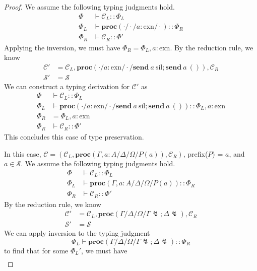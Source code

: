 \documentclass[12pt, openany]{memoir}
\newcommand*{\send}[2]{\textbf{send}\ #1\ #2}
\newcommand*{\cancel}[1]{#1 \lightning}
\newcommand*{\procObj}[4]{\textbf{proc}(#1/#2/#3/#4)}
\newcommand*{\config}[0]{\mathcal{C}}
\newcommand*{\cancelSet}[0]{\mathcal{S}}
\begin{document}
\begin{proof}
  We assume the following typing judgments hold.
  \begin{align*}
    \Phi & \vdash \config_L :: \Phi_L \\
    \Phi_L & \vdash \procObj{\cdot}{\cdot}{a : \text{exn}}{\cdot} :: \Phi_R \\
    \Phi_R & \vdash \config_R :: \Phi'
  \end{align*}
  Applying the inversion, we must have $\Phi_R = \Phi_L, a : \text{exn}$. By the reduction rule, we know
  \begin{align*}
    \config' &= \config_L, \procObj{\cdot}{a : \text{exn}}{\cdot}{\send{a}{\text{sil}}; \send{a}{()}}, \config_R \\
    \cancelSet' &= \cancelSet
  \end{align*}
  We can construct a typing derivation for $\config'$ as
  \begin{align*}
    \Phi & \vdash \config_L :: \Phi_L \\
    \Phi_L & \vdash \procObj{\cdot}{a : \text{exn}}{\cdot}{\send{a}{\text{sil}}; \send{a}{()}} :: \Phi_L, a : \text{exn} \\
    \Phi_R & = \Phi_L, a : \text{exn} \\
    \Phi_R & \vdash \config_R :: \Phi'
  \end{align*}
  This concludes this case of type preservation.
  \item [\stepref{cancel-prop-l}{cancel-prop-l}] In this case, $\config = (\config_L, \procObj{\Gamma, a : A}{\Delta}{\Omega}{P(a)}, \config_R)$,
    prefix($P$) = $a$, and $a \in \cancelSet$.
    We assume the following typing judgments hold.
    \begin{align*}
      \Phi & \vdash \config_L :: \Phi_L \\
      \Phi_L & \vdash \procObj{\Gamma, a : A}{\Delta}{\Omega}{P(a)} :: \Phi_R \\
      \Phi_R & \vdash \config_R :: \Phi'
    \end{align*}
    By the reduction rule, we know
    \begin{align*}
      \config' &= \config_L, \procObj{\Gamma}{\Delta}{\Omega}{\cancel{\Gamma};\cancel{\Delta}}, \config_R \\
      \cancelSet' &= \cancelSet
    \end{align*}
    We can apply inversion to the typing judgment
    \[
      \Phi_L \vdash \procObj{\Gamma}{\Delta}{\Omega}{\cancel{\Gamma};\cancel{\Delta}} :: \Phi_R
    \]
    to find that for some $\Phi_L'$, we must have
    \begin{align*}

\end{align*}
\end{proof}
\end{document}
